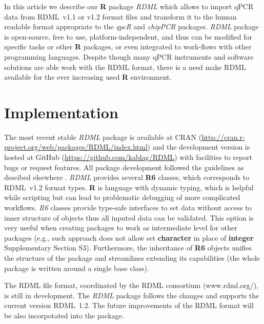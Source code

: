 \documentclass{bioinfo}
\begin{document}
	In this article we describe our \textbf{R} package \textit{RDML} which allows to
	import qPCR data from RDML~v1.1 or v1.2 format files and transform it to the
	human readable format appropriate to the \textit{qpcR} and \textit{chipPCR}
	packages. \textit{RDML} package is open-source, free to use,
	platform-independent, and thus can be modified for specific tasks or other
	\textbf{R} packages, or even integrated to work-flows with other programming
	languages. Despite though many qPCR instruments and software solutions are able
	work with the RDML format, there is a need make RDML available for the ever
	increasing used \textbf{R} environment.
	
	\section{Implementation}
	
	The most recent stable \textit{RDML} package is available at CRAN
	(\url{http://cran.r-project.org/web/packages/RDML/index.html}) and the
	development version is hosted at GitHub (\url{https://github.com/kablag/RDML})
	with facilities to report bugs or request features. All package development
	followed the guidelines as descibed elsewhere \cite{RDCT2014a}. \textit{RDML}
	provides several \textbf{R6} classes, which corresponds to RDML~v1.2 format types.
	\textbf{R} is language with dynamic typing, which is helpful while scripting but
	can lead to problematic debugging of more complicated workflows. \emph{R6} classes
	provide type-safe interfaces to set data without access to inner structure of
	objects thus all inputed data can be validated. This option is very useful when
	creating packages to work as intermediate level for other packages (e.g., such
	approach does not allow set \textbf{character} in place of \textbf{integer}
	Supplementary Section S3). Furthermore, the inheritance of \textbf{R6} objects 
	unifies the structure of the package and streamlines extending its capabilities 
	(the whole package is written around a single base class).
	
	The RDML file format, coordinated by the RDML consortium (www.rdml.org/), is still 
	in development. The \textit{RDML} package follows the changes and supports the 
	current version RDML~1.2. The future improvements of the RDML format will be also 
	incorpotated into the package.
	
\end{document}
